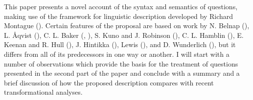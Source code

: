 This paper presents a novel account of the syntax and semantics of questions, making use of the framework for linguistic description developed by Richard Montague (\cite*{montague1974-selected-quantification}). Certain features of the proposal are based on work by N. Belnap (\cite*{belnap1963}), L. Åqvist (\cite*{aqvist1965}), C. L. Baker (\cite*{baker.c1968-thesis}, \cite*{baker.c1970-foundlang}), S. Kuno and J. Robinson (\cite*{kuno-robinson1972-li}), C. L. Hamblin (\cite*{hamblin1973-foundlang}), E. Keenan and R. Hull (\cite*{keenan-hull1973-petofi-franck}), J. Hintikka (\cite*{hintikka1974-munitz-unger}), Lewis (\cite*{lewis.d-lewis.s1975-theoria}), and D. Wunderlich (\cite*{wunderlich.d1976-fragesaetze}), but it differs from all of its predecessors in one way or another. I will start with a number of observations which provide the basis for the treatment of questions presented in the second part of the paper and conclude with a summary and a brief discussion of how the proposed description compares with recent transformational analyses.
\endinput